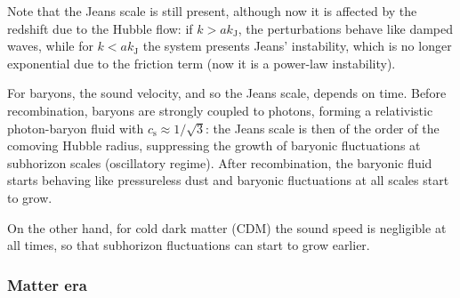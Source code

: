 Note that the Jeans scale is still present, although now it is affected by the redshift due to the Hubble flow: if $ k > a k_\text{J} $, the perturbations behave like damped waves, while for $ k < a k_\text{J} $ the system presents Jeans' instability, which is no longer exponential due to the friction term (now it is a power-law instability).

For baryons, the sound velocity, and so the Jeans scale, depends on time. Before recombination, baryons are strongly coupled to photons, forming a relativistic photon-baryon fluid with $ c_\text{s} \approx 1 / \sqrt{3} $: the Jeans scale is then of the order of the comoving Hubble radius, suppressing the growth of baryonic fluctuations at subhorizon scales (oscillatory regime). After recombination, the baryonic fluid starts behaving like pressureless dust and baryonic fluctuations at all scales start to grow.

On the other hand, for cold dark matter (CDM) the sound speed is negligible at all times, so that subhorizon fluctuations can start to grow earlier.

\subsubsection{Matter era}

